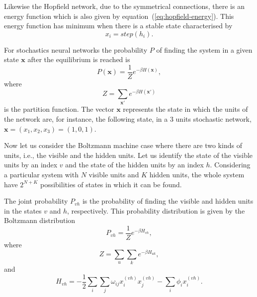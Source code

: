 Likewise the Hopfield network, due to the symmetrical connections, there is an energy function which is also given by equation~(\ref{eq:hopfield-energy}). This energy function has minimum when there is a stable state characterised by
\begin{equation}
  \label{eq:stochastic-stable-state}
  x_{i} = step(h_{i}).
\end{equation}

For stochastics neural networks the probability $P$ of finding the system in a given state $\mathbf{x}$ after the equilibrium is reached is
\begin{equation}
  \label{eq:stochastic-prob}
  P(\mathbf{x}) = \frac{1}{Z} e^{-\beta H(\mathbf{x})},
\end{equation}
where
\begin{equation}
  \label{eq:stochastic-z}
  Z = \sum_{\mathbf{x}'} e^{-\beta H(\mathbf{x}')}
\end{equation}
is the partition function. The vector $\mathrm{\mathbf{x}}$ represents the state in which the units of the network are, for instance, the following state, in a 3 units stochastic network, $\mathrm{\mathbf{x}} = (x_{1}, x_{2}, x_{3}) = (1, 0, 1)$.

Now let us consider the Boltzmann machine case where there are two kinds of units, i.e., the visible and the hidden units. 
Let us identify the state of the visible units by an index $v$ and the state of the hidden units by an index $h$. 
Considering a particular system with $N$ visible units and $K$ hidden units, the whole system have $2^{N + K}$ possibilities of states in which it can be found.

The joint probability $P_{vh}$ is the probability of finding the visible and hidden units in the states $v$ and $h$, respectively.
This probability distribution is given by the Boltzmann distribution
\begin{equation}
  \label{eq:bm-joint-prob}
  P_{vh} = \frac{1}{Z}e^{-\beta H_{vh}},
\end{equation}
where
\begin{equation}
  \label{eq:bm-z}
  Z = \sum_{u} \sum_{k} e^{-\beta H_{uk}},
\end{equation}
and
\begin{equation}
  \label{eq:bm-energy-function}
  H_{vh} = - \frac{1}{2} \sum_{i} \sum_{j} \omega_{ij} x^{(vh)}_{i} x^{(vh)}_{j} - \sum_{i} \phi_{i} x^{(vh)}_{i}.
\end{equation}

